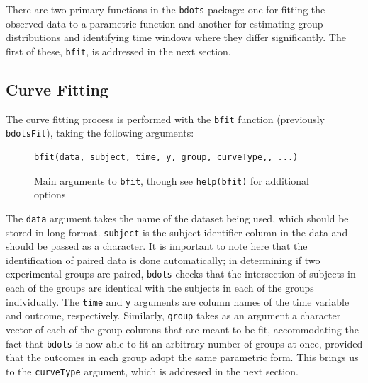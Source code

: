 \documentclass{article}
\newcommand{\xt}{\texttt}%
\begin{document}
There are two primary functions in the \xt{bdots} package: one for fitting the observed data to a parametric function and another for estimating group distributions and identifying time windows where they differ significantly. The first of these, \xt{bfit}, is addressed in the next section.


\subsection{Curve Fitting}

The curve fitting process is performed with the \texttt{bfit} function (previously \texttt{bdotsFit}), taking the following arguments:


\begin{figure}[h!]
\centering
\begin{BVerbatim}
bfit(data, subject, time, y, group, curveType,, ...)
\end{BVerbatim}
\caption{Main arguments to \xt{bfit}, though see \xt{help(bfit)} for additional options}
\end{figure}



The \xt{data} argument takes the name of the dataset being used, which should be stored in long format. \xt{subject} is the subject identifier column in the data and should be passed as a character. It is important to note here that the identification of paired data is done automatically; in determining if two experimental groups are paired, \xt{bdots} checks that the intersection of subjects in each of the groups are identical with the subjects in each of the groups individually. The \xt{time} and \xt{y} arguments are column names of the time variable and outcome, respectively. Similarly, \xt{group} takes as an argument a character vector of each of the group columns that are meant to be fit, accommodating the fact that \xt{bdots} is now able to fit an arbitrary number of groups at once, provided that the outcomes in each group adopt the same parametric form. This brings us to the \xt{curveType} argument, which is addressed in the next section.
\end{document}
